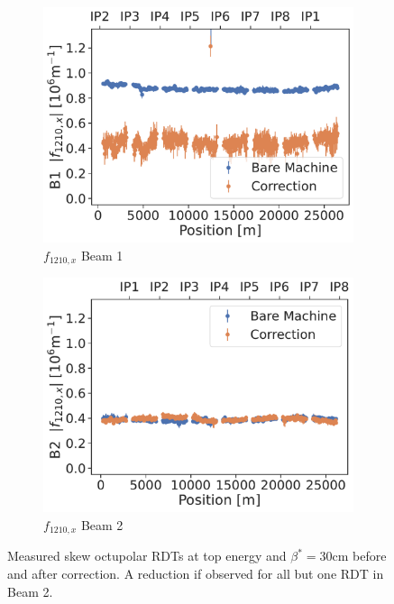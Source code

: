 \begin{figure}[!htb]
\begin{subfigure}{0.47\textwidth}
        \includegraphics[width=\textwidth]{./images/f1210_b1.pdf}
        \caption{$f_{1210,x}$ Beam 1}
    \end{subfigure}
    \hfill
    \begin{subfigure}{0.47\textwidth}
        \includegraphics[width=\textwidth]{./images/f1210_b2.pdf}
        \caption{$f_{1210,x}$ Beam 2}
    \end{subfigure}
    \caption{Measured skew octupolar RDTs at top energy and $\beta^*=30\text{cm}$ before and after
    correction. A reduction if observed for all but one RDT in Beam 2.} 
    \label{fig:skew_octupolar:corrections_vs_bare}
\end{figure}

